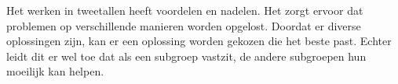 \documentclass{report}
\begin{document}
Het werken in tweetallen heeft voordelen en nadelen. Het zorgt ervoor dat problemen op verschillende manieren worden opgelost. Doordat er diverse oplossingen zijn, kan er een oplossing worden gekozen die het beste past. Echter leidt dit er wel toe dat als een subgroep vastzit, de andere subgroepen hun moeilijk kan helpen.  
\end{document}
